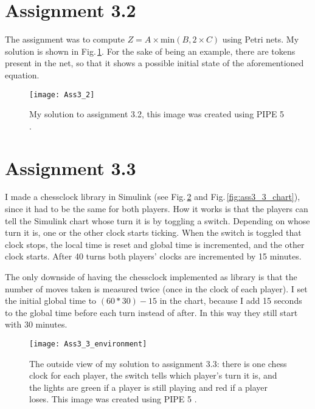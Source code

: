 \documentclass{article}
\begin{document}
	
	\section{Assignment 3.2}
	\par The assignment was to compute $Z = A \times \textrm{min}(B, 2\times C)$ using Petri nets. My solution is shown in Fig.\,\ref{fig:ass3_2}. For the sake of being an example, there are tokens present in the net, so that it shows a possible initial state of the aforementioned equation.
	
	\begin{figure}
		\centering
		\texttt{[image: Ass3\_2]}
		\caption{My solution to assignment 3.2, this image was created using PIPE 5 \cite{dingle2009pipe2, bonet2007pipe}. \label{fig:ass3_2}}
	\end{figure}
	
	
	\section{Assignment 3.3}
	\par I made a chessclock library in Simulink (see Fig.\,\ref{fig:ass3_3_env} and Fig.\,\ref{fig:ass3_3_chart}), since it had to be the same for both players. How it works is that the players can tell the Simulink chart whose turn it is by toggling a switch. Depending on whose turn it is, one or the other clock starts ticking. When the switch is toggled that clock stops, the local time is reset and global time is incremented, and the other clock starts. After 40 turns both players' clocks are incremented by 15 minutes.
	\par The only downside of having the chessclock implemented as library is that the number of moves taken is measured twice (once in the clock of each player). I set the initial global time to $(60*30) - 15$ in the chart, because I add 15 seconds to the global time before each turn instead of after. In this way they still start with 30 minutes.	
	
	\begin{figure}
		\centering
		\texttt{[image: Ass3\_3\_environment]}
		\caption{The outside view of my solution to assignment 3.3: there is one chess clock for each player, the switch tells which player's turn it is, and the lights are green if a player is still playing and red if a player loses.
		This image was created using PIPE 5 \cite{dingle2009pipe2, bonet2007pipe}. \label{fig:ass3_3_env}}
	\end{figure}
\end{document}
